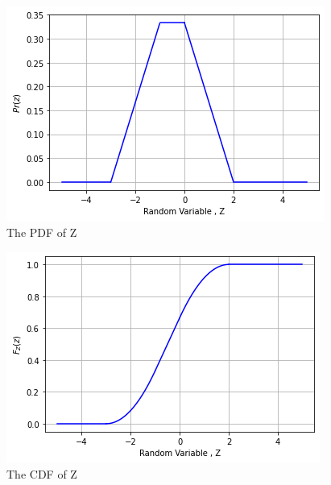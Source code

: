 \begin{figure}[!ht]
       \centering
    \includegraphics[width=.9\columnwidth] {solutions/ec/34/Figures/Assignment_3_PDF.png}
    \caption{The PDF of Z}
    \label{fig:The PDF of Z}
\end{figure}

\begin{figure}[!ht]
       \centering
    \includegraphics[width=.9\columnwidth] {solutions/ec/34/Figures/Assignment_3_CDF.png}
    \caption{The CDF of Z}
    \label{fig:The CDF of Z}
\end{figure}

